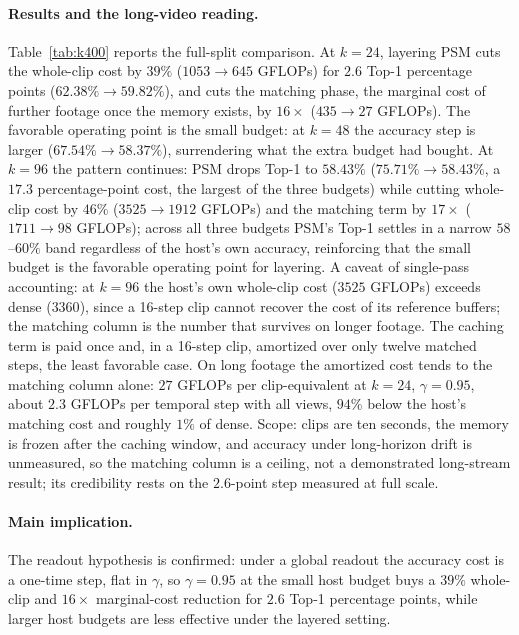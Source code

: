 \documentclass[letterpaper]{article}
\begin{document}
\paragraph{Results and the long-video reading.}
Table~\ref{tab:k400} reports the full-split comparison. At $k = 24$,
layering PSM cuts the whole-clip cost by $39\%$
($1053 \rightarrow 645$ GFLOPs) for $2.6$ Top-1 percentage points
($62.38\% \rightarrow 59.82\%$), and cuts the matching phase, the
marginal cost of further footage once the memory exists, by $16\times$
($435 \rightarrow 27$ GFLOPs). The favorable operating point is the
small budget: at $k = 48$ the accuracy step is larger
($67.54\% \rightarrow 58.37\%$), surrendering what the extra budget
had bought. At $k = 96$ the pattern continues: PSM drops Top-1 to
$58.43\%$ ($75.71\% \rightarrow 58.43\%$, a $17.3$ percentage-point cost, the
largest of the three budgets) while cutting whole-clip cost by
$46\%$ ($3525 \rightarrow 1912$ GFLOPs) and the matching term by
$17\times$ ($1711 \rightarrow 98$ GFLOPs); across all three budgets
PSM's Top-1 settles in a narrow $58$--$60\%$ band regardless of the
host's own accuracy, reinforcing that the small budget is the
favorable operating point for layering. A caveat of single-pass accounting: at $k = 96$ the
host's own whole-clip cost ($3525$ GFLOPs) exceeds dense ($3360$),
since a 16-step clip cannot recover the cost of its reference buffers;
the matching column is the number that survives on longer footage.
%
The caching term is paid once and, in a 16-step clip, amortized over
only twelve matched steps, the least favorable case. On long footage the
amortized cost tends to the matching column alone: $27$ GFLOPs per
clip-equivalent at $k = 24$, $\gamma = 0.95$, about $2.3$ GFLOPs per
temporal step with all views, $94\%$ below the host's matching cost
and roughly $1\%$ of dense. Scope: clips are ten seconds, the
memory is frozen after the caching window, and accuracy under
long-horizon drift is unmeasured, so the matching column is a ceiling,
not a demonstrated long-stream result; its credibility rests on the
$2.6$-point step measured at full scale.

\paragraph{Main implication.}
The readout hypothesis is confirmed: under a global readout the
accuracy cost is a one-time step, flat in $\gamma$, so $\gamma = 0.95$
at the small host budget buys a $39\%$ whole-clip and $16\times$
marginal-cost reduction for $2.6$ Top-1 percentage points, while larger host
budgets are less effective under the layered setting.
\end{document}
